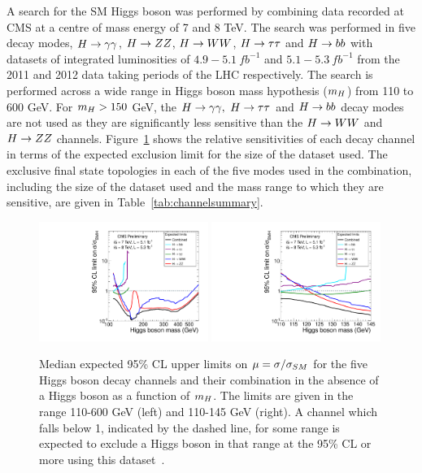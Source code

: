 A search for the SM Higgs boson was performed by combining data recorded at CMS 
at a centre of mass energy of 7 and 8 TeV. The search was performed in five
decay modes, $H\rightarrow\gamma\gamma$, $H\rightarrow ZZ$, $H\rightarrow WW$, $H\rightarrow\tau\tau$ and $H\rightarrow bb$ with datasets of
integrated luminosities of $4.9-5.1~fb^{-1}$ and $5.1-5.3~fb^{-1}$
from the 2011 and 2012 data taking periods of the LHC respectively.
The search is performed across a wide range in Higgs boson mass hypothesis ($m_{H}$) 
from 110 to 600 GeV. For $m_{H}>150$ GeV, the $H\rightarrow\gamma\gamma,~H\rightarrow\tau\tau$ and $H\rightarrow bb$ decay modes are not used
as they are significantly less sensitive than the $H\rightarrow WW$ and
$H\rightarrow ZZ$ channels. Figure~\ref{fig:expectedlimits} shows the relative sensitivities of 
each decay channel in terms of the expected exclusion limit for the size of the dataset 
used. The exclusive final state topologies in each of the five modes used
in the combination, including the size of the dataset used and the mass range to
which they are sensitive, are given in Table~\ref{tab:channelsummary}.

\begin{figure}
\begin{center}
	\includegraphics[width=0.49\textwidth]{combinations/ichep2012/Figure_001-a.pdf}
	\includegraphics[width=0.49\textwidth]{combinations/ichep2012/Figure_001-b.pdf}
\end{center}
	\caption{Median expected 95\% CL upper limits on $\mu=\sigma/\sigma_{SM}$ 
	for the five Higgs boson decay channels and their combination in the absence
	of a Higgs boson as a function of $m_{H}$. The limits are given in the range 
	110-600 GeV (left) and 110-145 GeV (right). A channel which falls below 1,
	indicated by the dashed line, for some range is expected to exclude a Higgs boson 
	in that range at the 95\% CL or more using this dataset~\citep{HIG-12-020}.}
\label{fig:expectedlimits}
\end{figure}

